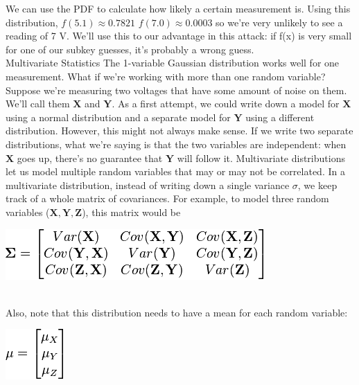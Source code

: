    We can use the PDF to calculate how likely a certain measurement is. Using
    this distribution, $f(5.1) \approx 0.7821$ $f(7.0) \approx 0.0003$ so we're
    very unlikely to see a reading of 7 V. We'll use this to our advantage in
    this attack: if f(x) is very small for one of our subkey guesses, it's
    probably a wrong guess.\\
    Multivariate Statistics The 1-variable Gaussian distribution works well for
    one measurement. What if we're working with more than one random variable?
    Suppose we're measuring two voltages that have some amount of noise on them.
    We'll call them $\mathbf{X}$ and $\mathbf{Y}$. As a first attempt, we could
    write down a model for $\mathbf{X}$ using a normal distribution and a
    separate model for $\mathbf{Y}$ using a different distribution. However,
    this might not always make sense. If we write two separate distributions,
    what we're saying is that the two variables are independent: when
    $\mathbf{X}$ goes up, there's no guarantee that $\mathbf{Y}$ will follow it.
    Multivariate distributions let us model multiple random variables that may
    or may not be correlated. In a multivariate distribution, instead of writing
    down a single variance $\sigma$, we keep track of a whole matrix of
    covariances. For example, to model three random variables ($\mathbf{X},
    \mathbf{Y}, \mathbf{Z}$), this matrix would be\\
    
    \begin{minipage}{\linewidth}
      \centering
      \includegraphics[scale=0.6]{images/Lecture_5/cov.png}
      \end{minipage}\\
      
      
    Also, note that this distribution needs to have a mean for each random
    variable:\\
    
       \begin{minipage}{\linewidth}
      \centering
      \includegraphics[scale=0.7]{images/Lecture_5/mu.png}
      \end{minipage}\\
      
